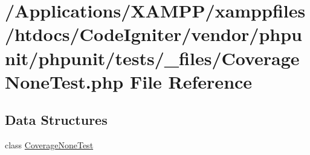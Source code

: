 \hypertarget{phpunit_2tests_2__files_2_coverage_none_test_8php}{}\section{/\+Applications/\+X\+A\+M\+P\+P/xamppfiles/htdocs/\+Code\+Igniter/vendor/phpunit/phpunit/tests/\+\_\+files/\+Coverage\+None\+Test.php File Reference}
\label{phpunit_2tests_2__files_2_coverage_none_test_8php}
\subsection*{Data Structures}
\begin{DoxyCompactItemize}
\item 
class \mbox{\hyperlink{class_coverage_none_test}{Coverage\+None\+Test}}
\end{DoxyCompactItemize}

